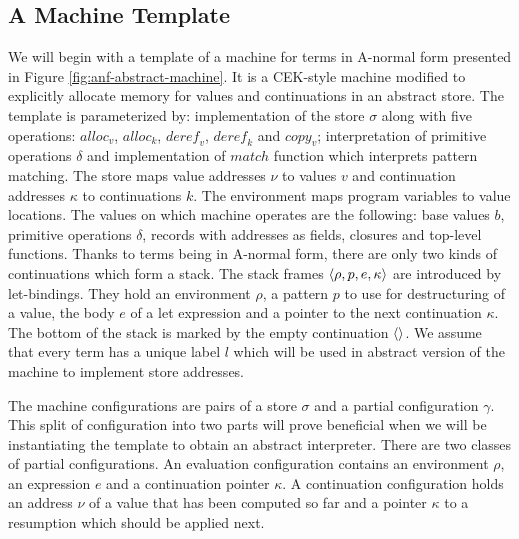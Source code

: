 \subsection*{A Machine Template}
We will begin with a template of a machine for \IDL{} terms in A-normal form presented in Figure \ref{fig:anf-abstract-machine}.
It is a CEK-style machine modified to explicitly allocate memory for values and continuations in an abstract store.
The template is parameterized by: implementation of the store $\sigma$ along with five operations: $\mathit{alloc}_v$, $\mathit{alloc}_k$, $\mathit{deref}_v$, $\mathit{deref}_k$ and $\mathit{copy}_v$; interpretation of primitive operations $\delta$ and implementation of $\mathit{match}$ function which interprets pattern matching.
The store maps value addresses $\nu$ to values $v$ and continuation addresses $\kappa$ to continuations $k$.
The environment maps program variables to value locations.
The values on which machine operates are the following: base values $b$, primitive operations $\delta$, records with addresses as fields, closures and top-level functions.
Thanks to terms being in A-normal form, there are only two kinds of continuations which form a stack.
The stack frames $\left< \rho, p, e, \kappa \right>$ are introduced by let-bindings. They hold an environment $\rho$, a pattern $p$ to use for destructuring of a value, the body $e$ of a let expression and a pointer to the next continuation $\kappa$.
The bottom of the stack is marked by the empty continuation $\left<  \right>$.
We assume that every term has a unique label $l$ which will be used in abstract version of the machine to implement store addresses.

The machine configurations are pairs of a store $\sigma$ and a partial configuration $\gamma$.
This split of configuration into two parts will prove beneficial when we will be instantiating the template to obtain an abstract interpreter.
There are two classes of partial configurations.
An evaluation configuration contains an environment $\rho$, an expression $e$ and a continuation pointer $\kappa$.
A continuation configuration holds an address $\nu$ of a value that has been computed so far and a pointer $\kappa$ to a resumption which should be applied next.

